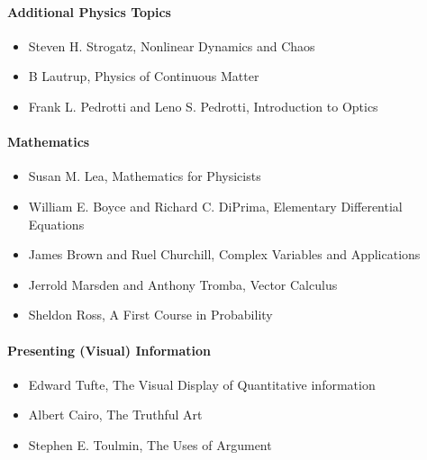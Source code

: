 \documentclass[letterpaper,10pt,english]{jupyterBook}
\begin{document}
\paragraph{Additional Physics Topics}
\label{\detokenize{content/0_course/design:additional-physics-topics}}\begin{itemize}
\item {} 
\sphinxAtStartPar
Steven H. Strogatz, Nonlinear Dynamics and Chaos

\item {} 
\sphinxAtStartPar
B Lautrup, Physics of Continuous Matter

\item {} 
\sphinxAtStartPar
Frank L. Pedrotti and Leno S. Pedrotti, Introduction to Optics

\end{itemize}


\paragraph{Mathematics}
\label{\detokenize{content/0_course/design:mathematics}}\begin{itemize}
\item {} 
\sphinxAtStartPar
Susan M. Lea, Mathematics for Physicists

\item {} 
\sphinxAtStartPar
William E. Boyce and Richard C. DiPrima, Elementary Differential Equations

\item {} 
\sphinxAtStartPar
James Brown and Ruel Churchill, Complex Variables and Applications

\item {} 
\sphinxAtStartPar
Jerrold Marsden and Anthony Tromba, Vector Calculus

\item {} 
\sphinxAtStartPar
Sheldon Ross, A First Course in Probability

\end{itemize}


\paragraph{Presenting (Visual) Information}
\label{\detokenize{content/0_course/design:presenting-visual-information}}\begin{itemize}
\item {} 
\sphinxAtStartPar
Edward Tufte, The Visual Display of Quantitative information

\item {} 
\sphinxAtStartPar
Albert Cairo, The Truthful Art

\item {} 
\sphinxAtStartPar
Stephen E. Toulmin, The Uses of Argument

\end{itemize}
\end{document}
